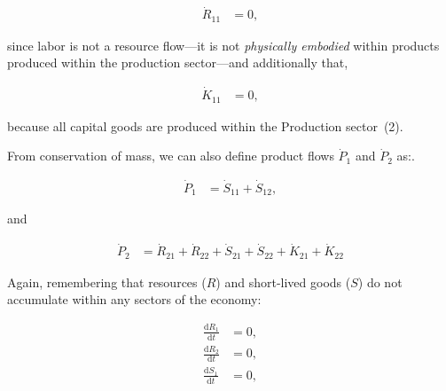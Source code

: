 \begin{align}
\label{eq:B_R11}
	\dot{R}_{11}				& 
	= 0,
\end{align}

\noindent{}since labor is not a resource flow---it
is not \emph{physically embodied} within products
produced within the production sector---and additionally that,

\begin{align}
\label{eq:B_K11}
	\dot{K}_{11}				& 
	= 0,
\end{align}
 
\noindent{}because all capital goods are produced within
the Production sector~(2).





From conservation of mass,
we can also define product flows
$\dot{P}_{1}$ and $\dot{P}_{2}$ as:.

\begin{align}
\label{eq:B_P1_def}
	\dot{P}_{1}				&
	= \dot{S}_{11}
	+ \dot{S}_{12},
\end{align}

\noindent{}and

\begin{align}
\label{eq:B_P2_def}
	\dot{P}_{2}				&
	= \dot{R}_{21}
	+ \dot{R}_{22}
	+ \dot{S}_{21}
	+ \dot{S}_{22}
	+ \dot{K}_{21}	 
	+ \dot{K}_{22}
\end{align}

\noindent Again, remembering that resources ($R$) 
and short-lived goods ($S$) do not accumulate 
within any sectors of the economy:

\begin{align}
\label{eq:dR_and_dS_zero}
	\frac{\mathrm{d}R_{1}}{\mathrm{d}t}			&
	= 0,																	\\
	\frac{\mathrm{d}R_{2}}{\mathrm{d}t} 			&
	= 0,																	\\
	\frac{\mathrm{d}S_{1}}{\mathrm{d}t} 			&
	= 0,
\end{align}

